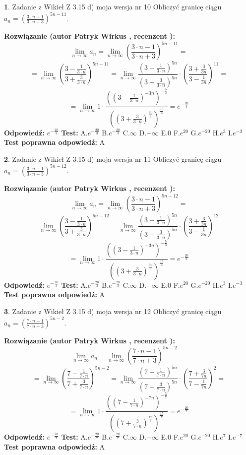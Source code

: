 \documentclass[12pt, a4paper]{article}
\theoremstyle{definition} %
\newtheorem{zad}{}
\newcommand{\zadStart}[1]{\begin{zad}#1\newline}
\newcommand{\zadStop}{\end{zad}}
\newcommand{\rozwStart}[2]{\noindent \textbf{Rozwiązanie (autor #1 , recenzent #2): }\newline}
\newcommand{\rozwStop}{\newline}
\newcommand{\odpStart}{\noindent \textbf{Odpowiedź:}\newline}
\newcommand{\odpStop}{\newline}
\newcommand{\testStart}{\noindent \textbf{Test:}\newline}
\newcommand{\testStop}{\newline}
\newcommand{\kluczStart}{\noindent \textbf{Test poprawna odpowiedź:}\newline}
\newcommand{\kluczStop}{\newline}
\begin{document}
\zadStart{Zadanie z Wikieł Z 3.15 d) moja wersja nr 10}
Obliczyć granicę ciągu $a_{n}=(\frac{3\cdot n - 1}{3 \cdot n + 3})^{5n-11}$.
\zadStop
\rozwStart{Patryk Wirkus}{}
$$\lim\limits_{n\to\infty} a_{n} = \lim\limits_{n\to\infty}(\frac{3\cdot n - 1}{3 \cdot n + 3})^{5n-11}=$$
$$=\lim\limits_{n\to\infty}(\frac{3 - \frac{1}{3\cdot n}}{3 + \frac{3}{3 \cdot n}})^{5n-11}=\lim\limits_{n\to\infty}\frac{(3 - \frac{1}{3\cdot n})^{5n}}{(3 + \frac{3}{3\cdot n})^{5n}} \cdot (\frac{3+\frac{3}{3n}}{3-\frac{1}{3n}})^{11}=$$
$$=\lim\limits_{n\to\infty} 1 \cdot \frac{((3-\frac{1}{3 \cdot n})^{-3n})^{-\frac{5}{3}}}{((3+\frac{3}{3 \cdot n})^{\frac{3n}{3}})^{\frac{15}{3}}} =e^{-\frac{20}{3}}$$
\rozwStop
\odpStart
$e^{-\frac{20}{3}}$
\odpStop
\testStart
A.$ e^{-\frac{20}{3}}$
B.$ e^{-\frac{20}{3}}$
C.$\infty$
D.$-\infty$
E.$0$
F.$e^{20}$
G.$e^{-20}$
H.$e^{3}$
I.$e^{-3}$
\testStop
\kluczStart
A
\kluczStop



\zadStart{Zadanie z Wikieł Z 3.15 d) moja wersja nr 11}
Obliczyć granicę ciągu $a_{n}=(\frac{3\cdot n - 1}{3 \cdot n + 3})^{5n-12}$.
\zadStop
\rozwStart{Patryk Wirkus}{}
$$\lim\limits_{n\to\infty} a_{n} = \lim\limits_{n\to\infty}(\frac{3\cdot n - 1}{3 \cdot n + 3})^{5n-12}=$$
$$=\lim\limits_{n\to\infty}(\frac{3 - \frac{1}{3\cdot n}}{3 + \frac{3}{3 \cdot n}})^{5n-12}=\lim\limits_{n\to\infty}\frac{(3 - \frac{1}{3\cdot n})^{5n}}{(3 + \frac{3}{3\cdot n})^{5n}} \cdot (\frac{3+\frac{3}{3n}}{3-\frac{1}{3n}})^{12}=$$
$$=\lim\limits_{n\to\infty} 1 \cdot \frac{((3-\frac{1}{3 \cdot n})^{-3n})^{-\frac{5}{3}}}{((3+\frac{3}{3 \cdot n})^{\frac{3n}{3}})^{\frac{15}{3}}} =e^{-\frac{20}{3}}$$
\rozwStop
\odpStart
$e^{-\frac{20}{3}}$
\odpStop
\testStart
A.$ e^{-\frac{20}{3}}$
B.$ e^{-\frac{20}{3}}$
C.$\infty$
D.$-\infty$
E.$0$
F.$e^{20}$
G.$e^{-20}$
H.$e^{3}$
I.$e^{-3}$
\testStop
\kluczStart
A
\kluczStop



\zadStart{Zadanie z Wikieł Z 3.15 d) moja wersja nr 12}
Obliczyć granicę ciągu $a_{n}=(\frac{7\cdot n - 1}{7 \cdot n + 3})^{5n-2}$.
\zadStop
\rozwStart{Patryk Wirkus}{}
$$\lim\limits_{n\to\infty} a_{n} = \lim\limits_{n\to\infty}(\frac{7\cdot n - 1}{7 \cdot n + 3})^{5n-2}=$$
$$=\lim\limits_{n\to\infty}(\frac{7 - \frac{1}{7\cdot n}}{7 + \frac{3}{7 \cdot n}})^{5n-2}=\lim\limits_{n\to\infty}\frac{(7 - \frac{1}{7\cdot n})^{5n}}{(7 + \frac{3}{7\cdot n})^{5n}} \cdot (\frac{7+\frac{3}{7n}}{7-\frac{1}{7n}})^{2}=$$
$$=\lim\limits_{n\to\infty} 1 \cdot \frac{((7-\frac{1}{7 \cdot n})^{-7n})^{-\frac{5}{7}}}{((7+\frac{3}{7 \cdot n})^{\frac{7n}{3}})^{\frac{15}{7}}} =e^{-\frac{20}{7}}$$
\rozwStop
\odpStart
$e^{-\frac{20}{7}}$
\odpStop
\testStart
A.$ e^{-\frac{20}{7}}$
B.$ e^{-\frac{20}{7}}$
C.$\infty$
D.$-\infty$
E.$0$
F.$e^{20}$
G.$e^{-20}$
H.$e^{7}$
I.$e^{-7}$
\testStop
\kluczStart
A
\kluczStop
\end{document}
